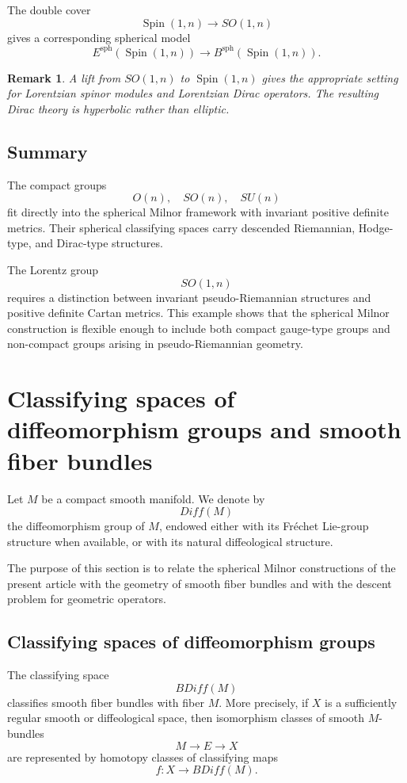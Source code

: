 \documentclass[11pt]{amsart}
\newtheorem{remark}[theorem]{Remark}
\begin{document}
The double cover
\[
\operatorname{Spin}(1,n)\to SO(1,n)
\]
gives a corresponding spherical model
\[
E^{\mathrm{sph}}(\operatorname{Spin}(1,n))
\to
B^{\mathrm{sph}}(\operatorname{Spin}(1,n)).
\]

\begin{remark}
A lift from \(SO(1,n)\) to \(\operatorname{Spin}(1,n)\) gives the appropriate setting for Lorentzian spinor modules and Lorentzian Dirac operators. The resulting Dirac theory is hyperbolic rather than elliptic.
\end{remark}

\subsection{Summary}

The compact groups
\[
O(n),\quad SO(n),\quad SU(n)
\]
fit directly into the spherical Milnor framework with invariant positive definite metrics. Their spherical classifying spaces carry descended Riemannian, Hodge-type, and Dirac-type structures.

The Lorentz group
\[
SO(1,n)
\]
requires a distinction between invariant pseudo-Riemannian structures and positive definite Cartan metrics. This example shows that the spherical Milnor construction is flexible enough to include both compact gauge-type groups and non-compact groups arising in pseudo-Riemannian geometry.
\section{Classifying spaces of diffeomorphism groups and smooth fiber bundles}
\label{sec:diff-classifying}

Let \(M\) be a compact smooth manifold. We denote by
\[
Diff(M)
\]
the diffeomorphism group of \(M\), endowed either with its Fréchet Lie-group
structure when available, or with its natural diffeological structure.

The purpose of this section is to relate the spherical Milnor constructions of
the present article with the geometry of smooth fiber bundles and with the
descent problem for geometric operators.

\subsection{Classifying spaces of diffeomorphism groups}

The classifying space
\[
BDiff(M)
\]
classifies smooth fiber bundles with fiber \(M\). More precisely, if \(X\) is
a sufficiently regular smooth or diffeological space, then isomorphism classes
of smooth \(M\)-bundles
\[
M\longrightarrow E\longrightarrow X
\]
are represented by homotopy classes of classifying maps
\[
f:X\longrightarrow BDiff(M).
\]
\end{document}

